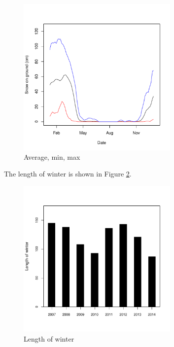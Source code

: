 \documentclass[12pt,twoside]{article}
\begin{document}
{\begin{figure}[!ht]
\begin{center}
\includegraphics[width=0.7\textwidth]{report-averagetsplot}
\end{center}
\caption{Average, min, max}
\label{fig:averagetsplot}
\end{figure}

The length of winter is shown in Figure \ref{fig:lengthwinter}. \lipsum[4]


\begin{figure}[!ht]
\begin{center}
\includegraphics[width=0.7\textwidth]{report-lengthwinter}
\end{center}
\caption{Length of winter}
\label{fig:lengthwinter}
\end{figure}

}
\end{document}
